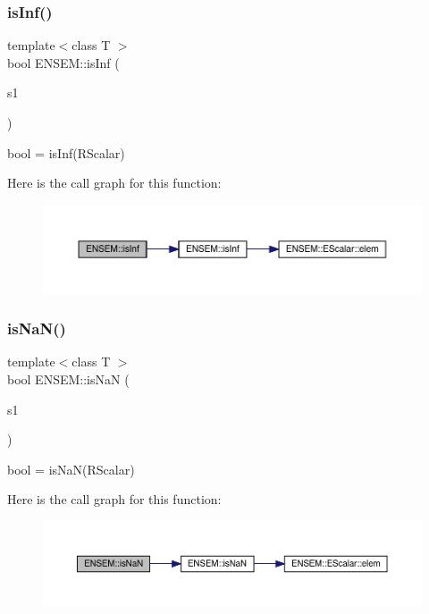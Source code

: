 \subsubsection{\texorpdfstring{isInf()}{isInf()}}
{\footnotesize\ttfamily template$<$class T $>$ \\
bool E\+N\+S\+E\+M\+::is\+Inf (\begin{DoxyParamCaption}\item[{const \mbox{\hyperlink{classENSEM_1_1RScalar}{R\+Scalar}}$<$ T $>$ \&}]{s1 }\end{DoxyParamCaption})}



bool = is\+Inf(\+R\+Scalar) 

Here is the call graph for this function\+:\nopagebreak
\begin{figure}[H]
\begin{center}
\leavevmode
\includegraphics[width=350pt]{d9/ded/group__rscalar_ga01c23e87027a8c43440f812a0693b62f_cgraph}
\end{center}
\end{figure}
\mbox{\label{group__rscalar_ga831d3981e39b262a19f78641d8b770c3}} 
\subsubsection{\texorpdfstring{isNaN()}{isNaN()}}
{\footnotesize\ttfamily template$<$class T $>$ \\
bool E\+N\+S\+E\+M\+::is\+NaN (\begin{DoxyParamCaption}\item[{const \mbox{\hyperlink{classENSEM_1_1RScalar}{R\+Scalar}}$<$ T $>$ \&}]{s1 }\end{DoxyParamCaption})}



bool = is\+Na\+N(\+R\+Scalar) 

Here is the call graph for this function\+:\nopagebreak
\begin{figure}[H]
\begin{center}
\leavevmode
\includegraphics[width=350pt]{d9/ded/group__rscalar_ga831d3981e39b262a19f78641d8b770c3_cgraph}
\end{center}
\end{figure}
\mbox{\label{group__rscalar_gad963fef363cb9cc2ca365a068821a5ff}} 
